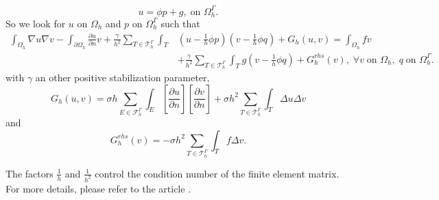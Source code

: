 \begin{enumerate}[label=\textbullet]
\begin{equation*}
		u=\phi p+g, \; \text{on } \Omega_h^\Gamma.
	\end{equation*}
	So we look for $u$ on $\Omega_h$ and $p$ on $\Omega_h^\Gamma$ such that
	\begin{align*}
		\int_{\Omega_h}\nabla u\nabla v-\int_{\partial\Omega_h}\frac{\partial u}{\partial n} v + \frac{\gamma}{h^2} \sum_{T\in\mathcal{T}_h^\Gamma}\int_T &\left(u-\frac{1}{h}\phi p\right)\left(v-\frac{1}{h}\phi q\right) + G_h(u,v) = \int_{\Omega_h}fv \\
		&+ \frac{\gamma}{h^2} \sum_{T\in\mathcal{T}_h^\Gamma}\int_T g\left(v-\frac{1}{h}\phi q\right) + G_h^{rhs}(v), \; \forall v \; \text{on } \Omega_h, \; q \; \text{on } \Omega_h^\Gamma.
	\end{align*}
	with $\gamma$ an other positive stabilization parameter,
	\begin{equation*}
		G_h(u,v)=\sigma h\sum_{E\in\mathcal{F}_h^\Gamma}\int_E\left[\frac{\partial u}{\partial n}\right]\left[\frac{\partial v}{\partial n}\right]+\sigma h^2\sum_{T\in\mathcal{T}_h^\Gamma}\int_T \Delta u\Delta v
	\end{equation*}
	and
	\begin{equation*}
		G_h^{rhs}(v)=-\sigma h^2\sum_{T\in\mathcal{T}_h^\Gamma}\int_T f\Delta v.
	\end{equation*}
	\begin{Rem}
		The factors $\frac{1}{h}$ and $\frac{1}{h^2}$ control the condition number of the finite element matrix. For more details, please refer to the article \cite{duprez_new_2023}.
	\end{Rem}
\end{enumerate}